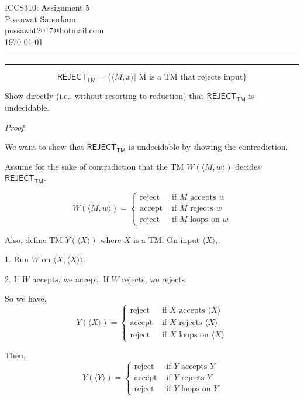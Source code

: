 \documentclass[a4paper, 11pt]{article}
\makeatletter
\newcommand{\question}[2] {\vspace{.25in} \hrule\vspace{0.5em}
	\noindent{\bf #1: #2} \vspace{0.5em}
	\hrule \vspace{.10in}}
\newcommand{\myname}{Possawat Sanorkam}
\newcommand{\myemail}{possawat2017@hotmail.com}
\newcommand{\myhwnum}{5}
\makeatother
\begin{document}
	
	\medskip                        %
	
	\thispagestyle{plain}
	\begin{center}                  %
		{\Large ICCS310: Assignment \myhwnum} \\
		\myname \\
		\myemail \\
		\today \\
	\end{center}
	
	\question{1}{Reject TM} %
	$$ \textsf{REJECT}_{\textsf{TM}} = \{\langle M , x \rangle | \text{ M is a TM that rejects input} \} $$
	
	Show directly (i.e., without resorting to reduction) that $\textsf{REJECT}_{\textsf{TM}}$ is undecidable.
	
	{\em Proof}: 
	
	We want to show that $\textsf{REJECT}_{\textsf{TM}}$ is undecidable by showing the contradiction.
	
	Assume for the sake of contradiction that the TM $W(\langle M, w\rangle)$ decides $\textsf{REJECT}_{\textsf{TM}}$.
	
	$$W(\langle M, w\rangle) = \begin{cases} 
	\text{reject} & \text{ if $M$ accepts $w$} \\
	\text{accept} & \text{ if $M$ rejects $w$} \\
	\text{reject} & \text{ if $M$ loops on $w$}
	\end{cases} $$
	
	Also, define TM $Y(\langle X\rangle)$ where $X$ is a TM. On input $\langle X\rangle$,
	
	1. Run $W$ on $\langle X, \langle X\rangle\rangle$.
	
	2. If $W$ accepts, we accept. If $W$ rejects, we rejects.
	
	So we have,
	$$Y(\langle X\rangle) = \begin{cases} 
	\text{reject} & \text{ if $X$ accepts $\langle X\rangle$} \\
	\text{accept} & \text{ if $X$ rejects $\langle X\rangle$} \\
	\text{reject} & \text{ if $X$ loops on $\langle X\rangle$}
	\end{cases} $$
	
	Then,
	$$Y(\langle Y\rangle) = \begin{cases} 
	\text{reject} & \text{ if $Y$ accepts $Y$} \\
	\text{accept} & \text{ if $Y$ rejects $Y$} \\
	\text{reject} & \text{ if $Y$ loops on $Y$}
	\end{cases} $$
	
\end{document}
